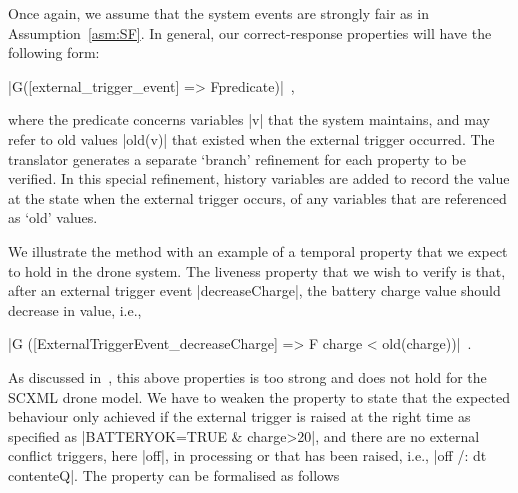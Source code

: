 
Once again, we assume that the system events are strongly fair as in
Assumption~\ref{asm:SF}.  In general, our correct-response properties
will have the following form:
\begin{center}
  |G([external_trigger_event] => F{predicate})|~,
\end{center}
where the predicate concerns variables |v| that the system maintains,
and may refer to old values |old(v)| that existed when the external
trigger occurred.  The translator generates a separate `branch'
refinement for each \LTL property to be verified.  In this special
refinement, history variables are added to record the value at the
state when the external trigger occurs, of any variables that are
referenced as `old' values.

We illustrate the method with an example of a temporal property that
we expect to hold in the drone \SCXML system.  The liveness property
that we wish to verify is that, after an external trigger event
|decreaseCharge|, the battery charge value should decrease in value, i.e.,
\begin{center}
  |G ([ExternalTriggerEvent_decreaseCharge] => F {charge < old(charge)})|~.
\end{center}
As discussed in~\cite{detect2020}, this above properties is too strong
and does not hold for the SCXML drone model.  We have to weaken the
property to state that the expected behaviour only achieved if the
external trigger is raised at the right time as specified as %
|{BATTERYOK=TRUE & charge>20}|, %
and there are no external conflict triggers, here |off|, in processing
or that has been raised, i.e., %
|off /: dt \/ content{eQ}|.  %
The property can be formalised as follows

